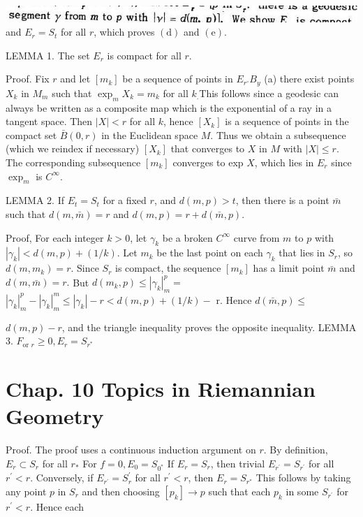 \documentclass[10pt]{article}
\begin{document}
\includegraphics[max width=\textwidth]{2022_07_16_f4e476ee2159dc67e746g-86}\\
and $E_{r}=S_{t}$ for all $r$, which proves $(\mathrm{d})$ and $(\mathrm{e})$.

LEMMA 1. The set $E_{r}$ is compact for all $r$.

Proof. Fix $r$ and let $\left[m_{k}\right]$ be a sequence of points in $E_{r^{\circ}} B_{y}$ (a) there exist points $X_{k}$ in $M_{m}$ such that $\exp _{m} X_{k}=m_{k}$ for all $k_{.}$This follows since a geodesic can always be written as a composite map which is the exponential of a ray in a tangent space. Then $|X|<r$ for all $k$, hence $\left[X_{k}\right]$ is a sequence of points in the compact set $\bar{B}(0, r)$ in the Euclidean space $M$. Thus we obtain a subsequence (which we reindex if necessary) $\left[X_{k}\right]$ that converges to $X$ in $M$ with $|X| \leq r$. The corresponding subsequence $\left[m_{k}\right]$ converges to exp $X$, which lies in $E_{r}$ since $\exp _{m}$ is $C^{\infty}$.

LEMMA 2. If $E_{t}=S_{t}$ for a fixed $r$, and $d(m, p)>t$, then there is a point $\bar{m}$ such that $d(m, \bar{m})=r$ and $d(m, p)=r+d(\bar{m}, p)$.

Proof, For each integer $k>0$, let $\gamma_{k}$ be a broken $C^{\infty}$ curve from $m$ to $p$ with $\left|\gamma_{k}\right|<d(m, p)+(1 / k)$. Let $m_{k}$ be the last point on each $\gamma_{k}$ that lies in $S_{r}$, so $d\left(m, m_{k}\right)=r$. Since $S_{r}$ is compact, the sequence $\left[m_{k}\right]$ has a limit point $\bar{m}$ and $d(m, \bar{m})=r .$ But $d\left(m_{k}, p\right) \leq\left|\gamma_{k}\right|_{m}^{p}=$ $\left|\gamma_{k}\right|_{m}^{p}-\left|\gamma_{k}\right|_{m}^{m} \leq\left|\gamma_{k}\right|-r<d(m, p)+(1 / k)-$ r. Hence $d(\bar{m}, p) \leq$

$d(m, p)-r$, and the triangle inequality proves the opposite inequality. LEMMA 3. $F_{\text {or } r} \geq 0, E_{r}=S_{r^{*}}$

\section{Chap. 10 Topics in Riemannian Geometry}
Proof. The proof uses a continuous induction argument on $r .$ By definition, $E_{r} \subset S_{r}$ for all $r_{*}$ For $f=0, E_{0}=S_{0^{*}}$ If $E_{r}=S_{r}$, then trivial $E_{r^{\prime}}=S_{r^{\prime}}$ for all $r^{\prime}<r$. Conversely, if $E_{r^{\prime}}=S_{r}^{\prime}$ for all $r^{\prime}<r$, then $E_{r}=S_{r^{*}}$ This follows by taking any point $p$ in $S_{r}$ and then choosing $\left[p_{k}\right] \rightarrow p$ such that each $p_{k}$ in some $S_{r^{\prime}}$ for $r^{\prime}<r$. Hence each
\end{document}
